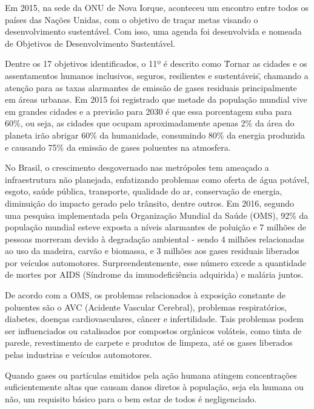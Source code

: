 
Em 2015, na sede da ONU de Nova Iorque, aconteceu um encontro entre todos 
os países das Nações Unidas, com o objetivo de traçar metas visando o 
desenvolvimento sustentável. Com isso, uma agenda foi desenvolvida e nomeada 
de Objetivos de Desenvolvimento Sustentável. 

Dentre os 17 objetivos identificados, o 11º é descrito como \"Tornar as cidades 
e os assentamentos humanos inclusivos, seguros, resilientes e sustentáveis\", 
chamando a atenção para as taxas alarmantes de emissão de gases residuais 
principalmente em áreas urbanas. Em 2015 foi registrado que metade da população 
mundial vive em grandes cidades e a previsão para 2030 é que essa porcentagem 
suba para 60\%, ou seja, as cidades que ocupam aproximadamente apenas 2\% da área 
do planeta irão abrigar 60\% da humanidade, consumindo 80\% da energia produzida 
e causando 75\% da emissão de gases poluentes na atmosfera. 

No Brasil, o crescimento desgovernado nas metrópoles tem ameaçado a infraestrutura 
não planejada, enfatizando problemas como oferta de água potável, esgoto, saúde 
pública, transporte, qualidade do ar, conservação de energia, diminuição do impacto 
gerado pelo trânsito, dentre outros. Em 2016, segundo uma pesquisa implementada 
pela Organização Mundial da Saúde (OMS), 92\% da população mundial esteve exposta a 
níveis alarmantes de poluição e 7  milhões de pessoas morreram devido à degradação 
ambiental - sendo 4 milhões relacionadas ao uso da madeira, carvão e biomassa, e 3 
milhões aos gases residuais liberados por veículos automotores. Surpreendentemente, 
esse número excede a quantidade de mortes por AIDS (Síndrome da imunodeficiência 
adquirida) e malária juntos.

De acordo com a OMS, os problemas relacionados à exposição constante de poluentes são 
o AVC (Acidente Vascular Cerebral), problemas respiratórios, diabetes, doenças 
cardiovasculares, câncer e infertilidade. Tais problemas podem ser influenciados ou 
catalisados por compostos orgânicos voláteis, como tinta de parede, revestimento de 
carpete e produtos de limpeza, até os gases liberados pelas industrias e veículos 
automotores.

Quando gases ou partículas emitidos pela ação humana atingem concentrações 
suficientemente altas que causam danos diretos à população, seja ela humana ou não, 
um requisito básico para o bem estar de todos é negligenciado.

